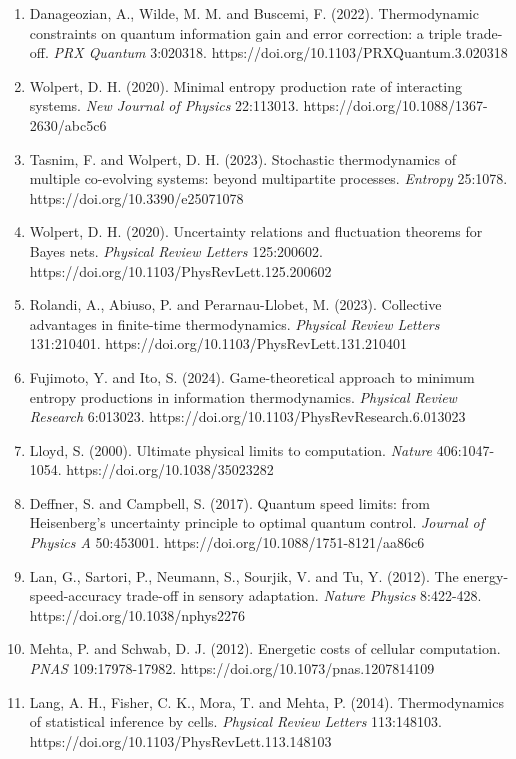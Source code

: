 \documentclass[
  10pt,
]{article}
\begin{document}
\begin{enumerate}
\item
  Danageozian, A., Wilde, M. M. and Buscemi, F. (2022). Thermodynamic
  constraints on quantum information gain and error correction: a triple
  trade-off. \emph{PRX Quantum} 3:020318.
  https://doi.org/10.1103/PRXQuantum.3.020318
\item
  Wolpert, D. H. (2020). Minimal entropy production rate of interacting
  systems. \emph{New Journal of Physics} 22:113013.
  https://doi.org/10.1088/1367-2630/abc5c6
\item
  Tasnim, F. and Wolpert, D. H. (2023). Stochastic thermodynamics of
  multiple co-evolving systems: beyond multipartite processes.
  \emph{Entropy} 25:1078. https://doi.org/10.3390/e25071078
\item
  Wolpert, D. H. (2020). Uncertainty relations and fluctuation theorems
  for Bayes nets. \emph{Physical Review Letters} 125:200602.
  https://doi.org/10.1103/PhysRevLett.125.200602
\item
  Rolandi, A., Abiuso, P. and Perarnau-Llobet, M. (2023). Collective
  advantages in finite-time thermodynamics. \emph{Physical Review
  Letters} 131:210401. https://doi.org/10.1103/PhysRevLett.131.210401
\item
  Fujimoto, Y. and Ito, S. (2024). Game-theoretical approach to minimum
  entropy productions in information thermodynamics. \emph{Physical
  Review Research} 6:013023.
  https://doi.org/10.1103/PhysRevResearch.6.013023
\item
  Lloyd, S. (2000). Ultimate physical limits to computation.
  \emph{Nature} 406:1047-1054. https://doi.org/10.1038/35023282
\item
  Deffner, S. and Campbell, S. (2017). Quantum speed limits: from
  Heisenberg's uncertainty principle to optimal quantum control.
  \emph{Journal of Physics A} 50:453001.
  https://doi.org/10.1088/1751-8121/aa86c6
\item
  Lan, G., Sartori, P., Neumann, S., Sourjik, V. and Tu, Y. (2012). The
  energy-speed-accuracy trade-off in sensory adaptation. \emph{Nature
  Physics} 8:422-428. https://doi.org/10.1038/nphys2276
\item
  Mehta, P. and Schwab, D. J. (2012). Energetic costs of cellular
  computation. \emph{PNAS} 109:17978-17982.
  https://doi.org/10.1073/pnas.1207814109
\item
  Lang, A. H., Fisher, C. K., Mora, T. and Mehta, P. (2014).
  Thermodynamics of statistical inference by cells. \emph{Physical
  Review Letters} 113:148103.
  https://doi.org/10.1103/PhysRevLett.113.148103

\end{enumerate}
\end{document}
